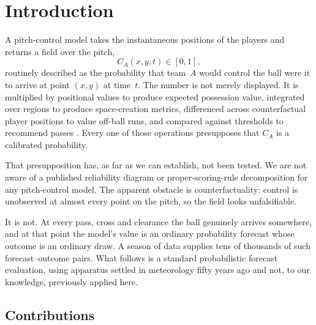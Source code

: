 \documentclass[11pt,a4paper]{article}
\begin{document}
\section{Introduction}

A pitch-control model takes the instantaneous positions of the players and
returns a field over the pitch,
\[
  C_A(x, y, t) \in [0, 1],
\]
routinely described as the probability that team~$A$ would control the ball were
it to arrive at point $(x, y)$ at time~$t$. The number is not merely displayed.
It is multiplied by positional values to produce expected possession value,
integrated over regions to produce space-creation metrics, differenced across
counterfactual player positions to value off-ball runs, and compared against
thresholds to recommend passes \citep{fernandez2018wide, fernandez2021epv,
spearman2018beyond}. Every one of those operations presupposes that $C_A$ is a
calibrated probability.

That presupposition has, as far as we can establish, not been tested. We are not
aware of a published reliability diagram or proper-scoring-rule decomposition for
any pitch-control model. The apparent obstacle is counterfactuality: control is
unobserved at almost every point on the pitch, so the field looks unfalsifiable.

It is not. At every pass, cross and clearance the ball genuinely arrives
somewhere, and at that point the model's value is an ordinary probability
forecast whose outcome is an ordinary draw. A season of data supplies tens of
thousands of such forecast--outcome pairs. What follows is a standard
probabilistic forecast evaluation, using apparatus settled in meteorology fifty
years ago \citep{brier1950verification, murphy1973partition} and not, to our
knowledge, previously applied here.

\subsection*{Contributions}
\end{document}
